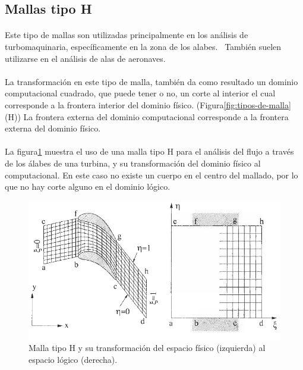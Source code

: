 \documentclass[letterpaper, openright, 12pt]{book}
\begin{document}
    \subsection{Mallas tipo H}
    \paragraph*{}
    Este tipo de mallas son utilizadas principalmente en los análisis de
    turbomaquinaria, específicamente en la zona de los
    alabes.~\cite{blazek}\cite{best-practices-grid-generation}
    También suelen utilizarse en el análisis de alas de
    aeronaves.~\cite{vladimir-grid}

    \paragraph*{}
    La transformación en este tipo de malla, también da como resultado un
    dominio computacional cuadrado, que puede tener o no, un corte al
    interior el cual corresponde a la frontera interior del dominio físico.
    (Figura\ref*{fig:tipos-de-malla} (H)) La frontera externa del dominio
    computacional corresponde a la frontera externa del dominio físico.

    \paragraph*{}
    La figura\ref{fig:malla-h} muestra el uso de una malla tipo H para el
    análisis del flujo a través de los álabes de una turbina, y su
    transformación del dominio físico al computacional. En este caso no
    existe un cuerpo en el centro del mallado, por lo que no hay corte
    alguno en el dominio lógico.
        \begin{figure}[htbp!]
            \centering
            \includegraphics[keepaspectratio, width=170mm]{./Imagenes/malla-h}
            \captionsetup{justification=centering, margin=2cm}
            \caption[Malla tipo O]{Malla tipo H y su transformación del
                espacio físico (izquierda) al espacio lógico (derecha).
                \cite{blazek}}
        \label{fig:malla-h}
        \end{figure}
\end{document}
